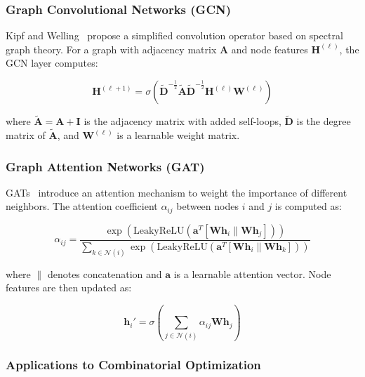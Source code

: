 \subsubsection{Graph Convolutional Networks (GCN)}

Kipf and Welling~\cite{kipf2017semi} propose a simplified convolution operator based on spectral graph theory. For a graph with adjacency matrix $\mathbf{A}$ and node features $\mathbf{H}^{(\ell)}$, the GCN layer computes:

\begin{equation}
\mathbf{H}^{(\ell+1)} = \sigma\left(\tilde{\mathbf{D}}^{-\frac{1}{2}} \tilde{\mathbf{A}} \tilde{\mathbf{D}}^{-\frac{1}{2}} \mathbf{H}^{(\ell)} \mathbf{W}^{(\ell)}\right)
\end{equation}

where $\tilde{\mathbf{A}} = \mathbf{A} + \mathbf{I}$ is the adjacency matrix with added self-loops, $\tilde{\mathbf{D}}$ is the degree matrix of $\tilde{\mathbf{A}}$, and $\mathbf{W}^{(\ell)}$ is a learnable weight matrix.

\subsubsection{Graph Attention Networks (GAT)}

GATs~\cite{veliccovic2018graph} introduce an attention mechanism to weight the importance of different neighbors. The attention coefficient $\alpha_{ij}$ between nodes $i$ and $j$ is computed as:

\begin{equation}
\alpha_{ij} = \frac{\exp(\text{LeakyReLU}(\mathbf{a}^T [\mathbf{W}\mathbf{h}_i \| \mathbf{W}\mathbf{h}_j]))}{\sum_{k \in \mathcal{N}(i)} \exp(\text{LeakyReLU}(\mathbf{a}^T [\mathbf{W}\mathbf{h}_i \| \mathbf{W}\mathbf{h}_k]))}
\end{equation}

where $\|$ denotes concatenation and $\mathbf{a}$ is a learnable attention vector. Node features are then updated as:

\begin{equation}
\mathbf{h}_i' = \sigma\left(\sum_{j \in \mathcal{N}(i)} \alpha_{ij} \mathbf{W} \mathbf{h}_j\right)
\end{equation}

\subsubsection{Applications to Combinatorial Optimization}

